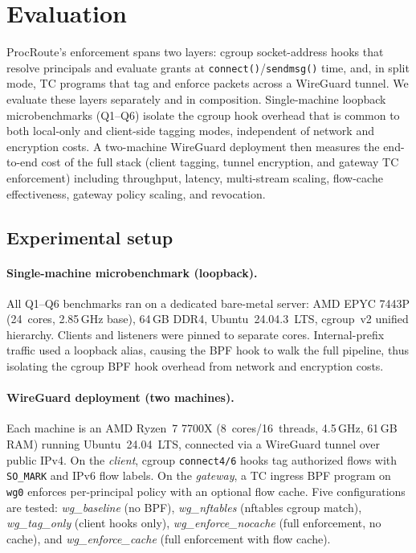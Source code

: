 \documentclass[sigconf]{acmart}
\begin{document}
\section{Evaluation}
\label{sec:eval}
ProcRoute's enforcement spans two layers: cgroup socket-address
hooks that resolve principals and evaluate grants at
\texttt{connect()}\slash\texttt{sendmsg()} time, and, in split
mode, TC programs that tag and enforce packets across a
WireGuard tunnel.
We evaluate these layers separately and in composition.
Single-machine loopback microbenchmarks (Q1--Q6) isolate the
cgroup hook overhead that is common to both local-only and
client-side tagging modes, independent of network and encryption
costs.
A two-machine WireGuard deployment then measures the end-to-end
cost of the full stack (client tagging, tunnel encryption, and
gateway TC enforcement) including throughput, latency,
multi-stream scaling, flow-cache effectiveness, gateway policy
scaling, and revocation.

\subsection{Experimental setup}
\label{sec:eval:setup}

\paragraph{Single-machine microbenchmark (loopback).}
All Q1--Q6 benchmarks ran on a dedicated bare-metal server:
AMD EPYC 7443P (24~cores, 2.85\,GHz base), 64\,GB DDR4,
Ubuntu~24.04.3~LTS, cgroup~v2 unified hierarchy.
Clients and listeners were pinned to separate cores.
Internal-prefix traffic used a loopback alias, causing the BPF
hook to walk the full pipeline, thus isolating the cgroup BPF hook overhead from network and
encryption costs.

\paragraph{WireGuard deployment (two machines).}
Each machine is an AMD Ryzen~7 7700X
(8~cores/16~threads, 4.5\,GHz, 61\,GB RAM) running
Ubuntu~24.04~LTS, connected via
a WireGuard tunnel over public IPv4.
On the \emph{client}, cgroup \texttt{connect4/6} hooks tag
authorized flows with \texttt{SO\_MARK} and IPv6 flow
labels.  On the \emph{gateway}, a TC ingress BPF program on
\texttt{wg0} enforces per-principal policy with an optional
flow cache.
Five configurations are tested:
\emph{wg\_baseline} (no BPF),
\emph{wg\_nftables} (nftables cgroup match),
\emph{wg\_tag\_only} (client hooks only),
\emph{wg\_enforce\_nocache} (full enforcement,
no cache), and \emph{wg\_enforce\_cache} (full
enforcement with flow cache).
\end{document}
